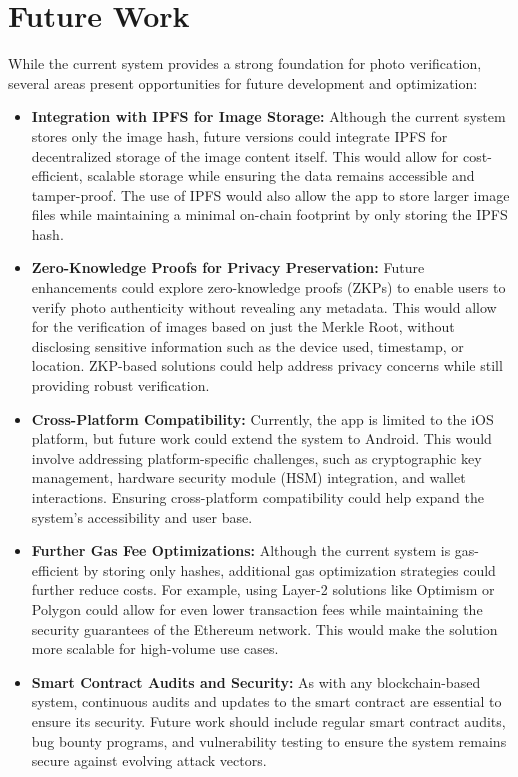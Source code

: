 \section{Future Work}
\label{sec:future-work}
While the current system provides a strong foundation for photo verification, several areas present opportunities for future development and optimization:

\begin{itemize}
    \item \textbf{Integration with IPFS for Image Storage:} Although the current system stores only the image hash, future versions could integrate IPFS for decentralized storage of the image content itself. This would allow for cost-efficient, scalable storage while ensuring the data remains accessible and tamper-proof. The use of IPFS would also allow the app to store larger image files while maintaining a minimal on-chain footprint by only storing the IPFS hash.
    \item \textbf{Zero-Knowledge Proofs for Privacy Preservation:} Future enhancements could explore zero-knowledge proofs (ZKPs) to enable users to verify photo authenticity without revealing any metadata. This would allow for the verification of images based on just the Merkle Root, without disclosing sensitive information such as the device used, timestamp, or location. ZKP-based solutions could help address privacy concerns while still providing robust verification.
    \item \textbf{Cross-Platform Compatibility:} Currently, the app is limited to the iOS platform, but future work could extend the system to Android. This would involve addressing platform-specific challenges, such as cryptographic key management, hardware security module (HSM) integration, and wallet interactions. Ensuring cross-platform compatibility could help expand the system's accessibility and user base.
    \item \textbf{Further Gas Fee Optimizations:} Although the current system is gas-efficient by storing only hashes, additional gas optimization strategies could further reduce costs. For example, using Layer-2 solutions like Optimism or Polygon could allow for even lower transaction fees while maintaining the security guarantees of the Ethereum network. This would make the solution more scalable for high-volume use cases.
    \item \textbf{Smart Contract Audits and Security:} As with any blockchain-based system, continuous audits and updates to the smart contract are essential to ensure its security. Future work should include regular smart contract audits, bug bounty programs, and vulnerability testing to ensure the system remains secure against evolving attack vectors.
\end{itemize}


